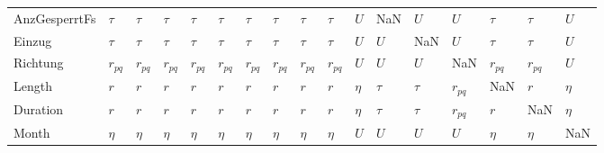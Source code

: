 \begin{tabular}{lllllllllllllllll}
AnzGesperrtFs &    $\tau$ &    $\tau$ &    $\tau$ &    $\tau$ &    $\tau$ &    $\tau$ &    $\tau$ &    $\tau$ &    $\tau$ &     $U$ &           NaN &     $U$ &       $U$ &    $\tau$ &    $\tau$ &     $U$ \\
Einzug        &    $\tau$ &    $\tau$ &    $\tau$ &    $\tau$ &    $\tau$ &    $\tau$ &    $\tau$ &    $\tau$ &    $\tau$ &     $U$ &           $U$ &     NaN &       $U$ &    $\tau$ &    $\tau$ &     $U$ \\
Richtung      &  $r_{pq}$ &  $r_{pq}$ &  $r_{pq}$ &  $r_{pq}$ &  $r_{pq}$ &  $r_{pq}$ &  $r_{pq}$ &  $r_{pq}$ &  $r_{pq}$ &     $U$ &           $U$ &     $U$ &       NaN &  $r_{pq}$ &  $r_{pq}$ &     $U$ \\
Length        &       $r$ &       $r$ &       $r$ &       $r$ &       $r$ &       $r$ &       $r$ &       $r$ &       $r$ &  $\eta$ &        $\tau$ &  $\tau$ &  $r_{pq}$ &       NaN &       $r$ &  $\eta$ \\
Duration      &       $r$ &       $r$ &       $r$ &       $r$ &       $r$ &       $r$ &       $r$ &       $r$ &       $r$ &  $\eta$ &        $\tau$ &  $\tau$ &  $r_{pq}$ &       $r$ &       NaN &  $\eta$ \\
Month         &    $\eta$ &    $\eta$ &    $\eta$ &    $\eta$ &    $\eta$ &    $\eta$ &    $\eta$ &    $\eta$ &    $\eta$ &     $U$ &           $U$ &     $U$ &       $U$ &    $\eta$ &    $\eta$ &     NaN \\
\bottomrule
\end{tabular}
